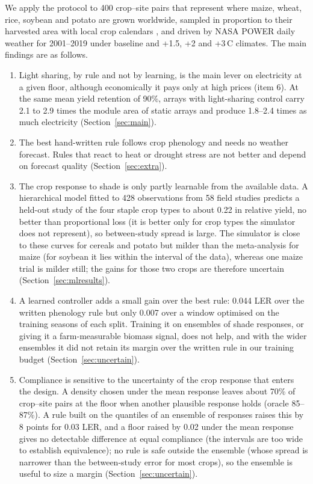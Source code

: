 We apply the protocol to 400 crop--site pairs that represent where maize, wheat, rice, soybean and potato are grown worldwide, sampled in proportion to their harvested area \citep{yu2020} with local crop calendars \citep{jagermeyr2021}, and driven by NASA POWER daily weather for 2001--2019 \citep{sparks2018} under baseline and +1.5, +2 and +3\,\textdegree C climates. The main findings are as follows.
\begin{enumerate}
\item Light sharing, by rule and not by learning, is the main lever on electricity at a given floor, although economically it pays only at high prices (item 6). At the same mean yield retention of 90\%, arrays with light-sharing control carry 2.1 to 2.9 times the module area of static arrays and produce 1.8--2.4 times as much electricity (Section~\ref{sec:main}).
\item The best hand-written rule follows crop phenology and needs no weather forecast. Rules that react to heat or drought stress are not better and depend on forecast quality (Section~\ref{sec:extra}).
\item The crop response to shade is only partly learnable from the available data. A hierarchical model fitted to 428 observations from 58 field studies predicts a held-out study of the four staple crop types to about 0.22 in relative yield, no better than proportional loss (it is better only for crop types the simulator does not represent), so between-study spread is large. The simulator is close to these curves for cereals and potato but milder than the meta-analysis for maize (for soybean it lies within the interval of the data), whereas one maize trial is milder still; the gains for those two crops are therefore uncertain (Section~\ref{sec:mlresults}).
\item A learned controller adds a small gain over the best rule: 0.044 LER over the written phenology rule but only 0.007 over a window optimised on the training seasons of each split. Training it on ensembles of shade responses, or giving it a farm-measurable biomass signal, does not help, and with the wider ensembles it did not retain its margin over the written rule in our training budget (Section~\ref{sec:uncertain}).
\item Compliance is sensitive to the uncertainty of the crop response that enters the design. A density chosen under the mean response leaves about 70\% of crop--site pairs at the floor when another plausible response holds (oracle 85--87\%). A rule built on the quantiles of an ensemble of responses raises this by 8 points for 0.03 LER, and a floor raised by 0.02 under the mean response gives no detectable difference at equal compliance (the intervals are too wide to establish equivalence); no rule is safe outside the ensemble (whose spread is narrower than the between-study error for most crops), so the ensemble is useful to size a margin (Section~\ref{sec:uncertain}).

\end{enumerate}
